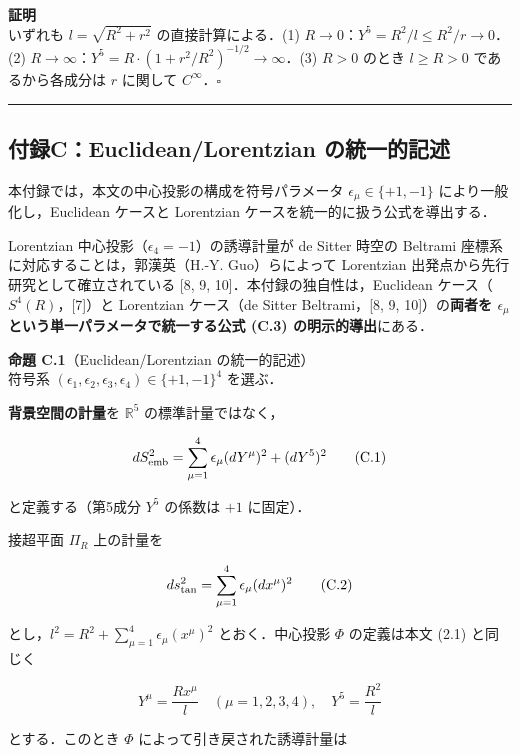 \documentclass[a4paper,11pt]{ltjsarticle}
\theoremstyle{definition}
\begin{document}
\textbf{証明}\\
いずれも \(l = \sqrt{R^2+r^2}\) の直接計算による．(1) \(R\to 0\)：\(Y^5 = R^2/l \leq R^2/r \to 0\)．(2) \(R\to\infty\)：\(Y^5 = R\cdot(1+r^2/R^2)^{-1/2} \to \infty\)．(3) \(R>0\) のとき \(l \geq R > 0\) であるから各成分は \(r\) に関して \(C^\infty\)．\(\square\)

\begin{center}\rule{0.5\linewidth}{0.5pt}\end{center}

\subsection{付録C：Euclidean/Lorentzian の統一的記述}\label{ux4ed8ux9332ceuclideanlorentzian-ux306eux7d71ux4e00ux7684ux8a18ux8ff0}

本付録では，本文の中心投影の構成を符号パラメータ \(\epsilon_\mu \in \{+1,-1\}\) により一般化し，Euclidean ケースと Lorentzian ケースを統一的に扱う公式を導出する．

Lorentzian 中心投影（\(\epsilon_4 = -1\)）の誘導計量が de Sitter 時空の Beltrami 座標系に対応することは，郭漢英（H.-Y. Guo）らによって Lorentzian 出発点から先行研究として確立されている {[}8, 9, 10{]}．本付録の独自性は，Euclidean ケース（\(S^4(R)\)，{[}7{]}）と Lorentzian ケース（de Sitter Beltrami，{[}8, 9, 10{]}）の\textbf{両者を \(\epsilon_\mu\) という単一パラメータで統一する公式 (C.3) の明示的導出}にある．

\textbf{命題 C.1}（Euclidean/Lorentzian の統一的記述）\\
符号系 \((\epsilon_1, \epsilon_2, \epsilon_3, \epsilon_4) \in \{+1,-1\}^4\) を選ぶ．

\textbf{背景空間の計量}を \(\mathbb{R}^5\) の標準計量ではなく，

\[dS^2_{\rm emb} = \sum_{\mu=1}^{4} \epsilon_\mu (dY^\mu)^2 + (dY^5)^2 \tag{C.1}\]

と定義する（第5成分 \(Y^5\) の係数は \(+1\) に固定）．

接超平面 \(\Pi_R\) 上の計量を

\[ds^2_{\rm tan} = \sum_{\mu=1}^{4} \epsilon_\mu (dx^\mu)^2 \tag{C.2}\]

とし，\(l^2 = R^2 + \sum_{\mu=1}^4 \epsilon_\mu (x^\mu)^2\) とおく．中心投影 \(\Phi\) の定義は本文 (2.1) と同じく

\[Y^\mu = \frac{R x^\mu}{l} \quad (\mu=1,2,3,4), \quad Y^5 = \frac{R^2}{l}\]

とする．このとき \(\Phi\) によって引き戻された誘導計量は
\end{document}
